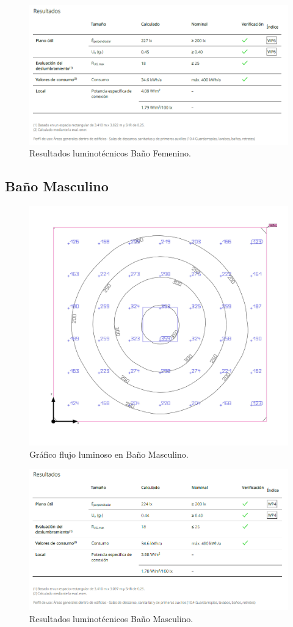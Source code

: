 \documentclass[../main.tex]{subfiles}
\begin{document}
\begin{figure}[H]
    \centering
    \includegraphics[width=0.75\linewidth]{Imagenes/Resultados Iluminacion Bano Femenino.png}
    \caption{Resultados luminotécnicos Baño Femenino.}
\end{figure}

\subsection{Baño Masculino}
\begin{figure}[H]
    \centering
    \includegraphics[width=0.5\linewidth]{Imagenes/Iluminacion Bano Masculino.png}
    \caption{Gráfico flujo luminoso en Baño Masculino.}
\end{figure}

\begin{figure}[H]
    \centering
    \includegraphics[width=0.75\linewidth]{Imagenes/Resultados Iluminacion Bano Masculino.png}
    \caption{Resultados luminotécnicos Baño Masculino.}
\end{figure}
\end{document}
